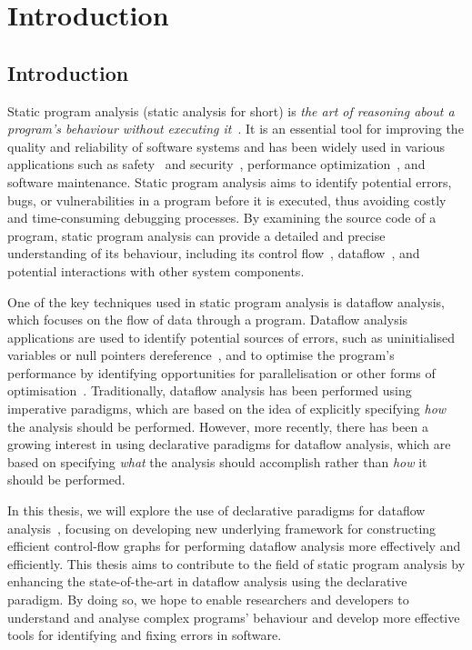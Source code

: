 \chapter{Introduction}
\section{Introduction}

Static program analysis (static analysis for short) is 
\emph{the art of reasoning about a program's behaviour without executing it}~\cite{spa}.
It is an essential tool for improving the quality and reliability of software
systems and has been widely used in various applications such
as safety~\cite{cousot2005astree,Blanchet2002} and security~\cite{piskachev2021secucheck,flowDroid,ayewah2008using,dura2021javadl,fink2012wala},
performance optimization~\cite{aho2007compilers,appel2004modern}, and software maintenance.
Static program analysis aims to identify potential errors, bugs, or vulnerabilities
in a program before it is executed, thus avoiding costly and time-consuming 
debugging processes. By examining the source code of a program, static program 
analysis can provide a detailed and precise understanding of its behaviour, including
its control flow~\cite{allen1970control}, dataflow~\cite{kam1977monotone}, and potential interactions with other system components.



One of the key techniques used in static program analysis is dataflow analysis,
which focuses on the flow of data through a program. Dataflow analysis applications are used to identify
potential sources of errors, such as uninitialised variables or null pointers dereference~\cite{riouak2021precise,10.1016/j.scico.2012.02.002}, 
and to optimise the program's performance by identifying opportunities for 
parallelisation or other forms of optimisation~\cite{aho2007compilers}.
Traditionally, dataflow analysis has been performed using imperative paradigms, 
which are based on the idea of explicitly specifying \emph{how} the analysis should be 
performed. 
However, more recently, there has been a growing interest in using 
declarative paradigms for dataflow analysis, which are based on specifying \emph{what}
the analysis should accomplish rather than \emph{how} it should be performed.

In this thesis, we will explore the use of declarative paradigms for dataflow 
analysis~\cite{smits2020flowspec,madsen2016programming}, focusing on developing new underlying framework for constructing 
efficient control-flow graphs for performing dataflow 
analysis more effectively and efficiently.
This thesis aims to contribute to the field of static program analysis 
by enhancing the state-of-the-art in dataflow analysis using the declarative paradigm. 
By doing so, we hope to enable researchers and developers to understand and 
analyse complex programs' behaviour and develop more effective tools for 
identifying and fixing errors in software.



